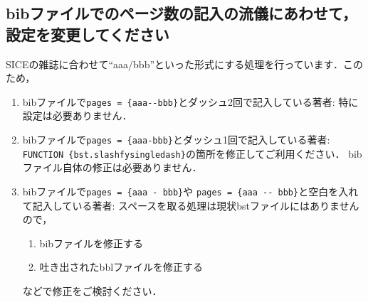 \documentclass[a4j,fleqn,dvipdfmx,twocolumn]{jsarticle}
\begin{document}
\subsection{bibファイルでのページ数の記入の流儀にあわせて，設定を変更してください}
SICEの雑誌に合わせて``aaa/bbb''といった形式にする処理を行っています．このため，
\begin{enumerate}
	\item bibファイルで\verb+pages = {aaa--bbb}+とダッシュ2回で記入している著者:
	      特に設定は必要ありません．
	\item bibファイルで\verb+pages = {aaa-bbb}+とダッシュ1回で記入している著者:
	      \verb+FUNCTION {bst.slashfysingledash}+の箇所を修正してご利用ください．
	      bibファイル自体の修正は必要ありません．
	\item bibファイルで\verb+pages = {aaa - bbb}+や
	      \verb+pages = {aaa -- bbb}+と空白を入れて記入している著者:
	      スペースを取る処理は現状bstファイルにはありませんので，
	      \begin{enumerate}
		      \item bibファイルを修正する
		      \item 吐き出されたbblファイルを修正する
	      \end{enumerate}
	      などで修正をご検討ください．
\end{enumerate}


\end{document}
